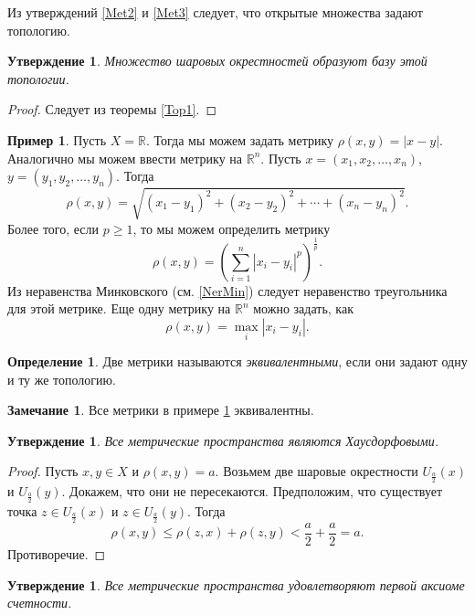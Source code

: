 \documentclass[12pt, titlepage, oneside]{amsbook}
\newcommand{\RR}{\mathbb{R}}
\newtheorem{claim}[theorem]{Утверждение}
\theoremstyle{definition}
\newtheorem{example}[theorem]{Пример}
\newtheorem{definition}[theorem]{Определение}
\newtheorem{remark}[theorem]{Замечание}
\theoremstyle{remark}
\begin{document}
Из утверждений \ref{Met2} и \ref{Met3} следует, что открытые множества задают топологию.

\begin{claim}
	\label{Met4}
	Множество шаровых окрестностей образуют базу этой топологии.
\end{claim}

\begin{proof}
	Следует из теоремы \ref{Top1}.
\end{proof}

\begin{example}
	\label{Ex1}
	Пусть $X=\RR$. Тогда мы можем задать метрику $\rho(x,y)=|x-y|$. Аналогично мы можем ввести метрику на $\RR^n$. Пусть $x=(x_1,x_2,\ldots,x_n)$, $y=(y_1,y_2,\ldots,y_n)$. Тогда $$\rho(x,y)=\sqrt{(x_1-y_1)^2+(x_2-y_2)^2+\cdots+(x_n-y_n)^2}.$$ Более того, если $p\geq 1$, то мы можем определить метрику $$\rho(x,y)=\left(\sum\limits_{i=1}^n|x_i-y_i|^p\right)^{\frac{1}{p}}.$$ Из неравенства Минковского (см. \ref{NerMin}) следует неравенство треугольника для этой метрике. Еще одну метрику на $\RR^n$ можно задать, как $$\rho(x,y)=\max\limits_i |x_i-y_i|.$$
\end{example}

\begin{definition}
	Две метрики называются \emph{эквивалентными}, если они задают одну и ту же топологию.
\end{definition}

\begin{remark}
	Все метрики в примере \ref{Ex1} эквивалентны.
\end{remark}

\begin{claim}
	\label{Met5}
	Все метрические пространства являются Хаусдорфовыми.
\end{claim}

\begin{proof}
	Пусть $x,y\in X$ и $\rho(x,y)=a$. Возьмем две шаровые окрестности $U_{\frac{a}{2}}(x)$ и $U_{\frac{a}{2}}(y)$. Докажем, что они не пересекаются. Предположим, что существует точка $z\in U_{\frac{a}{2}}(x)$ и $z\in U_{\frac{a}{2}}(y)$. Тогда $$\rho(x,y)\leq\rho(z,x)+\rho(z,y)<\frac{a}{2}+\frac{a}{2}=a.$$ Противоречие.
\end{proof}

\begin{claim}
	\label{Met6}
	Все метрические пространства удовлетворяют первой аксиоме счетности.
\end{claim}
\end{document}
